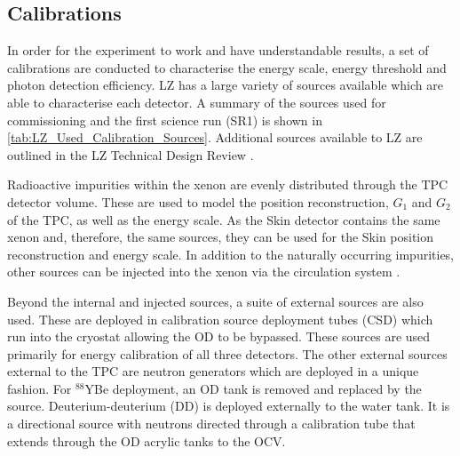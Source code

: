 \subsection{Calibrations}
\label{sec:lz_calibrations}
\par
In order for the experiment to work and have understandable results, a set of calibrations are conducted to characterise the energy scale, energy threshold and photon detection efficiency.
LZ has a large variety of sources available which are able to characterise each detector.
A summary of the sources used for commissioning and the first science run (SR1) is shown in \autoref{tab:LZ_Used_Calibration_Sources}.
Additional sources available to LZ are outlined in the LZ Technical Design Review \cite{LZ_TechnicalDesignReview_ref}.
\par
Radioactive impurities within the xenon are evenly distributed through the TPC detector volume.
These are used to model the position reconstruction, $G_1$ and $G_2$ of the TPC, as well as the energy scale.
As the Skin detector contains the same xenon and, therefore, the same sources, they can be used for the Skin position reconstruction and energy scale.
In addition to the naturally occurring impurities, other sources can be injected into the xenon via the circulation system \cite{christophernedlik_thesis_ref}.
\par
Beyond the internal and injected sources, a suite of external sources are also used.
These are deployed in calibration source deployment tubes (CSD) which run into the cryostat allowing the OD to be bypassed.
These sources are used primarily for energy calibration of all three detectors.
The other external sources external to the TPC are neutron generators which are deployed in a unique fashion.
For $^{88}$YBe deployment, an OD tank is removed and replaced by the source.
Deuterium-deuterium (DD) is deployed externally to the water tank. 
It is a directional source with neutrons directed through a calibration tube that extends through the OD acrylic tanks to the OCV.

